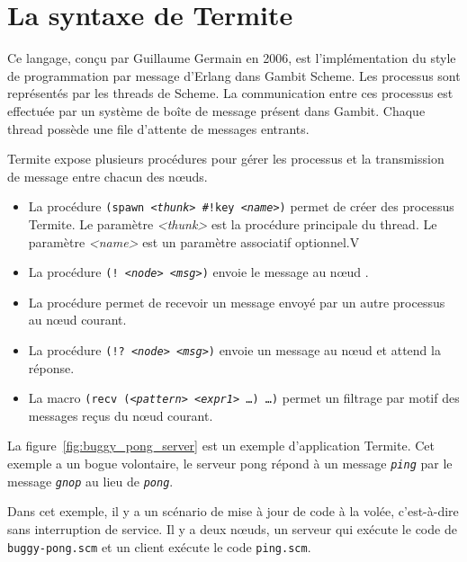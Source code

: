 \section{La syntaxe de Termite}

Ce langage, conçu par Guillaume Germain en 2006, est l'implémentation du style
de programmation par message d'Erlang dans Gambit Scheme.  Les processus sont
représentés par les threads de Scheme. La communication entre ces processus est
effectuée par un système de boîte de message présent dans Gambit. Chaque thread
possède une file d'attente de messages entrants.

Termite expose plusieurs procédures pour gérer les processus et la transmission
de message entre chacun des nœuds.

\begin{itemize}
  \item La procédure \texttt{(spawn \textit{<thunk>} \#!key \textit{<name>})} permet de
    créer des processus Termite. Le paramètre \textit{<thunk>} est la procédure principale
    du thread. Le paramètre \textit{<name>} est un paramètre associatif optionnel.V

  \item La procédure \texttt{(! \textit{<node>} \textit{<msg>})} envoie le message
     au nœud .

  \item La procédure  permet de recevoir un message
    envoyé par un autre processus au nœud courant.

  \item La procédure \texttt{(!? \textit{<node>} \textit{<msg>})} envoie un message au
    nœud  et attend la réponse.

  \item La macro \texttt{(recv (\textit{<pattern>} \textit{<expr1>} \dots) \dots)}
    permet un filtrage par motif des messages reçus du nœud courant.

\end{itemize}

La figure~\ref{fig:buggy_pong_server} est un exemple d'application Termite.
Cet exemple a un bogue volontaire, le serveur pong répond à un message
\texttt{\itshape ping} par le message \texttt{\itshape gnop} au lieu de
\texttt{\itshape pong}.

Dans cet exemple, il y a un scénario de mise à jour de code à la volée,
c'est-à-dire sans interruption de service. Il y a deux nœuds, un serveur
qui exécute le code de \texttt{buggy-pong.scm} et un client exécute le
code \texttt{ping.scm}.


